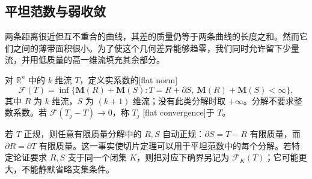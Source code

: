 \subsection{平坦范数与弱收敛}
\label{g3:subsec:2203:03}
两条距离很近但互不重合的曲线，其差的质量仍等于两条曲线的长度之和。然而它们之间的薄带面积很小。为了使这个几何差异能够趋零，我们同时允许留下少量流，并用低质量的高一维流填充其余部分。

\begin{definition}\label{g3:def:flat-norm}
	对 \(\mathbb R^n\) 中的 \(k\) 维流 \(T\)，定义实系数的[flat norm]
	\begin{equation}\label{g3:eq:flat-norm}
		\mathcal F(T)=\inf\{\mathbf M(R)+\mathbf M(S):
		T=R+\partial S,\ \mathbf M(R)+\mathbf M(S)<\infty\},
	\end{equation}
	其中 \(R\) 为 \(k\) 维流，\(S\) 为 \((k+1)\) 维流；没有此类分解时取 \(+\infty\)。分解不要求整数系数。若 \(\mathcal F(T_j-T)\to0\)，称 \(T_j\) [flat convergence]于 \(T\)。
\end{definition}

若 \(T\) 正规，则任意有限质量分解中的 \(R,S\) 自动正规：\(\partial S=T-R\) 有限质量，而 \(\partial R=\partial T\) 有限质量。这一事实使切片定理可以用于平坦范数中的每个分解。若特定论证要求 \(R,S\) 支于同一个闭集 \(K\)，则把对应下确界另记为 \(\mathcal F_K(T)\)；它可能更大，不能静默省略支集条件。

